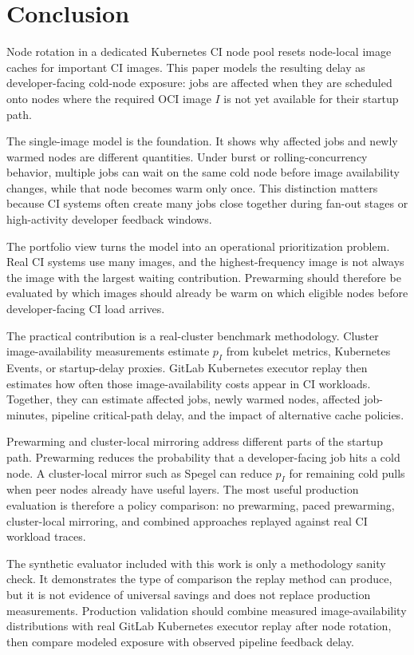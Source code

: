 \documentclass[11pt,a4paper]{article}
\begin{document}
\section{Conclusion}

Node rotation in a dedicated Kubernetes CI node pool resets node-local image caches for important CI images. This paper models the resulting delay as developer-facing cold-node exposure: jobs are affected when they are scheduled onto nodes where the required OCI image \(I\) is not yet available for their startup path.

The single-image model is the foundation. It shows why affected jobs and newly warmed nodes are different quantities. Under burst or rolling-concurrency behavior, multiple jobs can wait on the same cold node before image availability changes, while that node becomes warm only once. This distinction matters because CI systems often create many jobs close together during fan-out stages or high-activity developer feedback windows.

The portfolio view turns the model into an operational prioritization problem. Real CI systems use many images, and the highest-frequency image is not always the image with the largest waiting contribution. Prewarming should therefore be evaluated by which images should already be warm on which eligible nodes before developer-facing CI load arrives.

The practical contribution is a real-cluster benchmark methodology. Cluster image-availability measurements estimate \(p_I\) from kubelet metrics, Kubernetes Events, or startup-delay proxies. GitLab Kubernetes executor replay then estimates how often those image-availability costs appear in CI workloads. Together, they can estimate affected jobs, newly warmed nodes, affected job-minutes, pipeline critical-path delay, and the impact of alternative cache policies.

Prewarming and cluster-local mirroring address different parts of the startup path. Prewarming reduces the probability that a developer-facing job hits a cold node. A cluster-local mirror such as Spegel can reduce \(p_I\) for remaining cold pulls when peer nodes already have useful layers. The most useful production evaluation is therefore a policy comparison: no prewarming, paced prewarming, cluster-local mirroring, and combined approaches replayed against real CI workload traces.

The synthetic evaluator included with this work is only a methodology sanity check. It demonstrates the type of comparison the replay method can produce, but it is not evidence of universal savings and does not replace production measurements. Production validation should combine measured image-availability distributions with real GitLab Kubernetes executor replay after node rotation, then compare modeled exposure with observed pipeline feedback delay.
\end{document}

